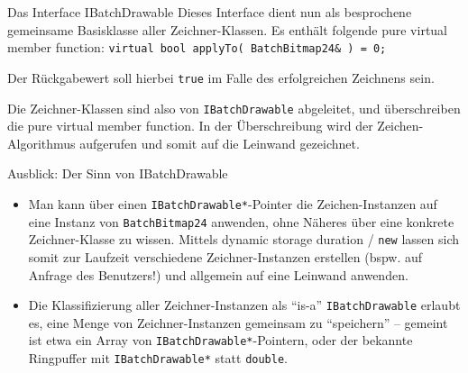 \begin{frame}[fragile]{Das Interface IBatchDrawable}
	Dieses Interface dient nun als besprochene gemeinsame Basisklasse aller Zeichner-Klassen. Es enthält folgende pure virtual member function: \verb|virtual bool applyTo( BatchBitmap24& ) = 0;|
	
	Der Rückgabewert soll hierbei \verb|true| im Falle des erfolgreichen Zeichnens sein.
	
	\pause
	\vspace{1em}
	
	Die Zeichner-Klassen sind also von \verb|IBatchDrawable| abgeleitet, und überschreiben die pure virtual member function. In der Überschreibung wird der Zeichen-Algorithmus aufgerufen und somit auf die Leinwand gezeichnet.
\end{frame}

\begin{frame}[fragile]{Ausblick: Der Sinn von IBatchDrawable}
	\begin{itemize}
		\item Man kann über einen \verb|IBatchDrawable*|-Pointer die Zeichen-Instanzen auf eine Instanz von \verb|BatchBitmap24| anwenden, ohne Näheres über eine konkrete Zeichner-Klasse zu wissen. Mittels dynamic storage duration / \verb|new| lassen sich somit zur Laufzeit verschiedene Zeichner-Instanzen erstellen (bspw. auf Anfrage des Benutzers!) und allgemein auf eine Leinwand anwenden.
		\item Die Klassifizierung aller Zeichner-Instanzen als \enquote{is-a} \verb|IBatchDrawable| erlaubt es, eine Menge von Zeichner-Instanzen gemeinsam zu \enquote{speichern} -- gemeint ist etwa ein Array von \verb|IBatchDrawable*|-Pointern, oder der bekannte Ringpuffer mit \verb|IBatchDrawable*| statt \verb|double|.
	\end{itemize}
\end{frame}

